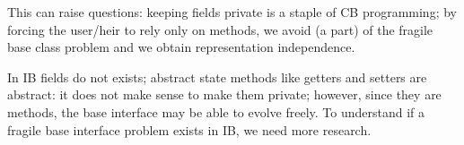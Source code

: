 This can raise questions: keeping fields private is a staple of CB \objectoriented programming;
by forcing the user/heir to rely only on methods, we avoid (a part)
of the fragile base class problem and we obtain representation independence.

In IB fields do not exists; abstract state methods like getters and setters are abstract:
it does not make sense to make them private; however, since they are methods,
the base interface may be able to evolve freely.
To understand if a fragile base interface problem exists in IB, we need more research.



%
%
%
%
%
%



